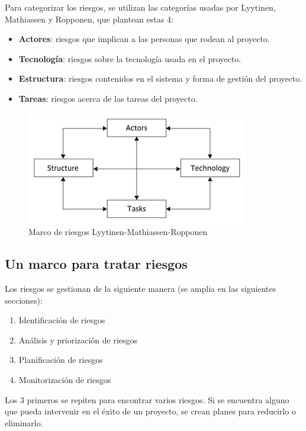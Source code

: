 \documentclass[12pt]{article}
\begin{document}
{Para categorizar los riesgos, se utilizan las categorías usadas por Lyytinen, Mathiassen y Ropponen, que plantean estas 4:}

\begin{itemize}
    \item {\textbf{Actores}: riesgos que implican a las personas que rodean al proyecto.}
    \item {\textbf{Tecnología}: riesgos sobre la tecnología usada en el proyecto.}
    \item {\textbf{Estructura}: riesgos contenidos en el sistema y forma de gestión del proyecto.}
    \item {\textbf{Tareas}: riesgos acerca de las tareas del proyecto.}
\end{itemize}

\begin{figure} [ht]
    \centering
    \includegraphics[keepaspectratio=true, scale=1.25]{images/Lyytinen-Mathiassen-Ropponen.png}
    \caption{Marco de riesgos Lyytinen-Mathiassen-Ropponen}
    \label{fig:7.1}
\end{figure}

\newpage
\subsection{Un marco para tratar riesgos}
\label{7.4.0}

{Los riesgos se gestionan de la siguiente manera (se amplia en las siguientes secciones):}

\begin{enumerate}
    \item {Identificación de riesgos}
    \item {Análisis y priorización de riesgos}
    \item {Planificación de riesgos}
    \item {Monitorización de riesgos}
\end{enumerate}

{Los 3 primeros se repiten para encontrar varios riesgos. Si se encuentra alguno que pueda intervenir en el éxito de un proyecto, se crean planes para reducirlo o eliminarlo.}
\end{document}
